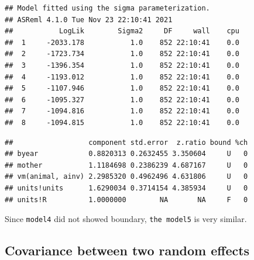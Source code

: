 \documentclass[
  12pt,
]{book}
\newenvironment{Shaded}{\begin{snugshade}}{\end{snugshade}}
\newcommand{\KeywordTok}[1]{\textcolor[rgb]{0.13,0.29,0.53}{\textbf{#1}}}
\newcommand{\NormalTok}[1]{#1}
\newcommand{\OperatorTok}[1]{\textcolor[rgb]{0.81,0.36,0.00}{\textbf{#1}}}
\begin{document}
\begin{verbatim}
## Model fitted using the sigma parameterization.
## ASReml 4.1.0 Tue Nov 23 22:10:41 2021
##           LogLik        Sigma2     DF     wall    cpu
##  1     -2033.178           1.0    852 22:10:41    0.0
##  2     -1723.734           1.0    852 22:10:41    0.0
##  3     -1396.354           1.0    852 22:10:41    0.0
##  4     -1193.012           1.0    852 22:10:41    0.0
##  5     -1107.946           1.0    852 22:10:41    0.0
##  6     -1095.327           1.0    852 22:10:41    0.0
##  7     -1094.816           1.0    852 22:10:41    0.0
##  8     -1094.815           1.0    852 22:10:41    0.0
\end{verbatim}

\begin{Shaded}
\end{Shaded}

\begin{verbatim}
##                  component std.error  z.ratio bound %ch
## byear            0.8820313 0.2632455 3.350604     U   0
## mother           1.1184698 0.2386239 4.687167     U   0
## vm(animal, ainv) 2.2985320 0.4962496 4.631806     U   0
## units!units      1.6290034 0.3714154 4.385934     U   0
## units!R          1.0000000        NA       NA     F   0
\end{verbatim}

Since \texttt{model4} did not showed boundary, \texttt{the\ model5} is very similar.

\hypertarget{covariance-between-two-random-effects}{%
\subsection{Covariance between two random effects}\label{covariance-between-two-random-effects}}
\end{document}
